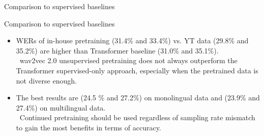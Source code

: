 \begin{frame}{Comparison to supervised baselines}
    
\end{frame}

\begin{frame}{Comparison to supervised baselines}
\begin{itemize}
    \item WERs of in-house pretraining (31.4\% and 33.4\%) vs. YT data (29.8\% and 35.2\%) are higher than Transformer baseline (31.0\% and 35.1\%).
    \\ \textrightarrow \,
    wav2vec 2.0 unsupervised pretraining does not always outperform the Transformer supervised-only approach, especially when the pretrained data is not diverse enough.
    
    \item The best results are (24.5 \% and 27.2\%) on monolingual data and (23.9\% and 27.4\%) on multilingual data.
    \\ \textrightarrow \,
    Continued pretraining should be used regardless of sampling rate mismatch to gain the most benefits in terms of accuracy.
\end{itemize}
\end{frame}